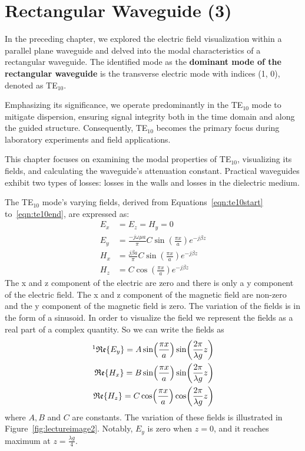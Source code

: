 \chapter{Rectangular Waveguide (3)}
In the preceding chapter, we explored the electric field visualization within a parallel plane waveguide and delved into the modal characteristics of a rectangular waveguide. The identified mode as the \textbf{dominant mode of the rectangular waveguide} is the transverse electric mode with indices (1, 0), denoted as TE$_{10}$.

Emphasizing its significance, we operate predominantly in the TE$_{10}$ mode to mitigate dispersion, ensuring signal integrity both in the time domain and along the guided structure. Consequently, TE$_{10}$ becomes the primary focus during laboratory experiments and field applications.

This chapter focuses on examining the modal properties of TE$_{10}$, visualizing its fields, and calculating the waveguide's attenuation constant. Practical waveguides exhibit two types of losses: losses in the walls and losses in the dielectric medium.

The TE$_{10}$ mode's varying fields, derived from Equations~\eqref{eqn:te10start} to~\eqref{eqn:te10end}, are expressed as:
\begin{align*}
E_{x} &= E_{z} = H_{y} = 0\\
E_{y} &= \frac{-j\omega\mu a }{\pi} C\sin(\frac{\pi x}{a}) e ^{-j\beta z}\\
H_{x} &= \frac{j\beta a}{\pi} C \sin(\frac{\pi x}{a})e^{-j\beta z} \\
H_{z} &= C\cos(\frac{\pi x}{a}) e^{-j\beta z}
\end{align*}
The x and z component of the electric are zero and there is only a y component of the electric field. The x and z component of the magnetic field are non-zero and the y component of the magnetic field is zero. The variation of the fields is in the form of a sinusoid. In order to visualize the field we represent the fields as a real part of a complex quantity. So we can write the fields as
\begin{align}
\footnotemark\mathfrak{Re}\{E_{y}\} = A\sin(\frac{\pi x}{a})\sin(\frac{2\pi}{\lambda g}z)
\label{eqn:eyppw}\\
\mathfrak{Re}\{H_{x}\} = B\sin(\frac{\pi x}{a})\sin(\frac{2\pi}{\lambda g}z)\\
\mathfrak{Re}\{H_{z}\} = C\cos(\frac{\pi x}{a})\cos(\frac{2\pi}{\lambda g}z)
\end{align}
where $A, B$ and $C$ are constants. The variation of these fields is illustrated in Figure~\ref{fig:lectureimage2}. Notably, $E_{y}$ is zero when $z = 0$, and it reaches maximum at $z = \frac{\lambda g}{4}$.

